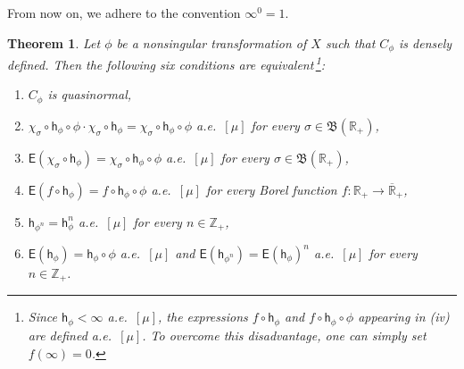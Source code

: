 \documentclass[draft,reqno]{amsproc}
\numberwithin{equation}{section}
\newtheorem{thm}{Theorem}[section]
\theoremstyle{remark}
\theoremstyle{definition}
\begin{document}
From now on, we adhere to the convention $\infty^0=1$.
   \begin{thm} \label{chquas}
Let $\phi$ be a nonsingular transformation of $X$ such
that $C_{\phi}$ is densely defined. Then the following
six conditions are equivalent\,\footnote{\;Since
${\mathsf h}_{\phi} < \infty$ a.e.\ $[\mu]$, the expressions
$f\circ {\mathsf h}_{\phi}$ and $f\circ {\mathsf h}_{\phi}\circ
\phi$ appearing in (iv) are defined a.e.\ $[\mu]$. To
overcome this disadvantage, one can simply set
$f(\infty)=0$.}{\em :}
   \begin{enumerate}
   \item[(i)] $C_{\phi}$ is quasinormal,
   \item[(ii)] $\chi_{\sigma} \circ {\mathsf h}_{\phi} \circ \phi
\cdot \chi_{\sigma} \circ {\mathsf h}_{\phi} = \chi_{\sigma}
\circ {\mathsf h}_{\phi} \circ \phi$ a.e.\ $[\mu]$ for every
$\sigma \in {{\mathfrak B}({{\mathbb R}_+})}$,
   \item[(iii)] ${\mathsf{E}}(\chi_{\sigma} \circ {\mathsf h}_{\phi})
= \chi_{\sigma} \circ {\mathsf h}_{\phi} \circ \phi$ a.e.\
$[\mu]$ for every $\sigma \in {{\mathfrak B}({{\mathbb R}_+})}$,
   \item[(iv)] ${\mathsf{E}}(f \circ {\mathsf h}_{\phi})
= f \circ {\mathsf h}_{\phi} \circ \phi$ a.e.\ $[\mu]$ for
every Borel function $f\colon {\mathbb R}_+ \to {{\overline{\mathbb R}_+}}$,
   \item[(v)] ${\mathsf h}_{\phi^n} = {\mathsf h}_{\phi}^n$
a.e.\ $[\mu]$ for every $n\in {\mathbb Z}_+$,
   \item[(vi)] ${\mathsf{E}}({\mathsf h}_{\phi}) = {\mathsf h}_{\phi}
\circ \phi$ a.e.\ $[\mu]$ and ${\mathsf{E}}({\mathsf h}_{\phi^n}) =
{\mathsf{E}}({\mathsf h}_{\phi})^n$ a.e.\ $[\mu]$ for every $n\in
{\mathbb Z}_+$.
   \end{enumerate}

   \end{thm}
\end{document}
